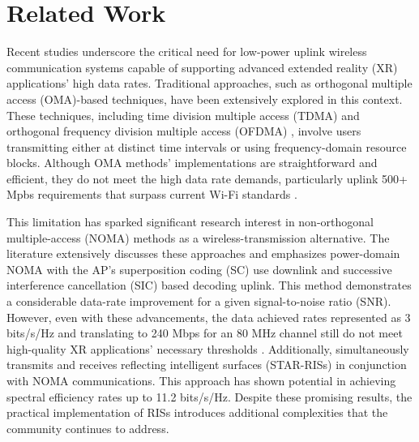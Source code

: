 \section{Related Work}
Recent studies \cite{xr1, xr2, xr3, xr4} underscore the critical need for low-power uplink wireless communication systems capable of supporting advanced extended reality (XR) applications' high data rates. Traditional approaches, such as orthogonal multiple access (OMA)-based techniques, have been extensively explored in this context. These techniques, including time division multiple access (TDMA) and orthogonal frequency division multiple access (OFDMA) \cite{louie1992multiple}, involve users transmitting either at distinct time intervals or using frequency-domain resource blocks. Although OMA methods' implementations are straightforward and efficient, they do not meet the high data rate demands, particularly uplink 500+ Mpbs requirements that surpass current Wi-Fi standards \cite{ieee80211bRevision, ieee80211ac2013, ieee80211ax2021}.

This limitation has sparked significant research interest in non-orthogonal multiple-access (NOMA) methods as a wireless-transmission alternative. The literature \cite{noma1, noma2, noma3, noma4, noma5} extensively discusses these approaches and emphasizes power-domain NOMA with the AP's superposition coding (SC) use downlink and successive interference cancellation (SIC) based decoding uplink. This method demonstrates a considerable data-rate improvement for a given signal-to-noise ratio (SNR). However, even with these advancements, the data achieved rates represented as 3 bits/s/Hz and translating to 240 Mbps for an 80 MHz channel still do not meet high-quality XR applications' necessary thresholds  \cite{noma1, noma2, noma3, noma4}. Additionally, \cite{noma5} simultaneously transmits and receives reflecting intelligent surfaces (STAR-RISs) in conjunction with NOMA communications. This approach has shown potential in achieving spectral efficiency rates up to 11.2 bits/s/Hz. Despite these promising results, the practical implementation of RISs introduces additional complexities that the community continues to address. 



